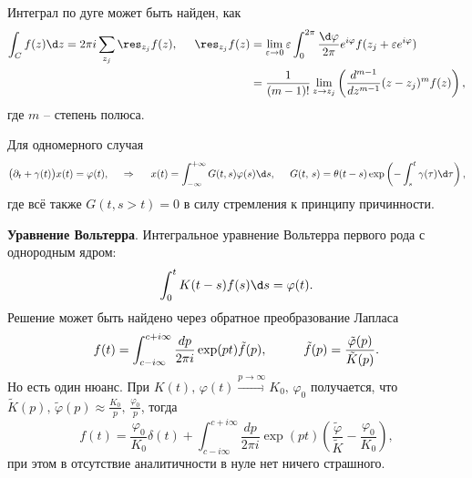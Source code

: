 

Интеграл по дуге может быть найден, как
\begin{align*}
    \int_C f(z) \d z = 2 \pi i \sum_{z_j} \res_{z_j} f(z),
    \hspace{5 mm} 
    \res_{z_j} f(z) &= \lim_{\varepsilon \to 0} \varepsilon \int_0^{2\pi} \frac{\d \varphi}{2\pi} e^{i \varphi} f(z_j + \varepsilon e^{i \varphi}) \\ 
    &= \frac{1}{(m-1)!} \lim_{z \to z_j} \left(
        \frac{d^{m-1} }{d z^{m-1}} (z-z_j)^m f(z)
    \right),
\end{align*}
где $m$ -- степень полюса. 






Для одномерного случая
\begin{equation*}
    \big(\partial_t + \gamma(t)\big) x(t) = \varphi(t),
    \hspace{0.5cm} \Rightarrow \hspace{0.5cm}
    x(t) = \int_{-\infty}^{+\infty}  G(t,s) \varphi(s) \d s,
    \hspace{5 mm} 
    G(t,\,  s) = \theta(t-s) \exp\left(
        - \int_{s}^{t} \gamma(\tau) \d \tau
    \right),
\end{equation*}
где всё также $G(t, s>t) = 0$ в силу стремления к принципу причинности. 






\textbf{Уравнение Вольтерра}. Интегральное уравнение Вольтерра первого рода с однородным ядром:
\begin{equation*}
    \int_{0}^{t}  K(t-s) f(s) \d s = \varphi(t).
\end{equation*}
Решение может быть найдено через обратное преобразование Лапласа
\begin{equation*}
    f(t) = \int_{c-i \infty}^{c+i \infty} \frac{d p}{2 \pi i} \exp(pt) \tilde{f}(p),
    \hspace{10 mm} 
    \tilde{f}(p) = \frac{\tilde{\varphi}(p)}{\tilde{K}(p)}.
\end{equation*}
Но есть один нюанс. При $K(t),\, \varphi(t) \overset{p \to \infty}{\to} K_0,\, \varphi_0$ получается, что $\tilde{K}(p),\, \tilde{\varphi}(p) \approx \frac{K_0}{p},\, \frac{\varphi_0}{p}$, тогда
\begin{equation*}
    f(t) = \frac{\varphi_0}{K_0} \delta(t) + \int_{c-i \infty}^{c+i \infty} \frac{d p}{2 \pi i} \exp(p t)
    \left(
        \frac{\tilde{\varphi}}{\tilde{K}} - \frac{\varphi_0}{K_0}
    \right),
\end{equation*}
при этом в отсутствие аналитичности в нуле нет ничего страшного. 




